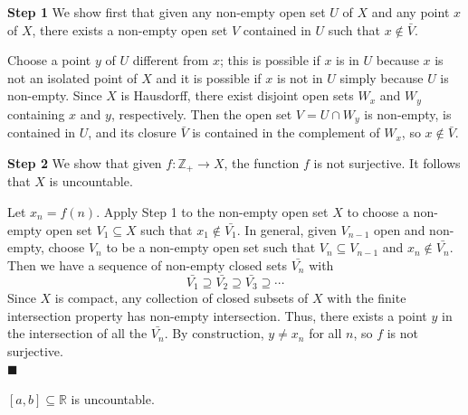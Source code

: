 \documentclass[main.tex]{subfiles}
\begin{document}
\par \noindent \textbf{Step 1} We show first that given any non-empty open set $U$ of $X$ and any point $x$ of $X$, there exists a non-empty open set $V$ contained in $U$ such that $x \notin \bar{V}$. 
\par Choose a point $y$ of $U$ different from $x$; this is possible if $x$ is in $U$ because $x$ is not an isolated point of $X$ and it is possible if $x$ is not in $U$ simply because $U$ is non-empty. Since $X$ is Hausdorff, there exist disjoint open sets $W_x$ and $W_y$ containing $x$ and $y$, respectively. Then the open set $V = U \cap W_y$ is non-empty, is contained in $U$, and its closure $\bar{V}$ is contained in the complement of $W_x$, so $x \notin \bar{V}$. 
\par \noindent \textbf{Step 2} We show that given $f: \mathbb{Z}_{+} \to X$, the function $f$ is not surjective. It follows that $X$ is uncountable. 
\par Let $x_n = f(n)$. Apply Step 1 to the non-empty open set $X$ to choose a non-empty open set $V_1 \subseteq X$ such that $x_1 \notin \bar{V_1}$. In general, given $V_{n - 1}$ open and non-empty, choose $V_n$ to be a non-empty open set such that $V_n \subseteq V_{n - 1}$ and $x_n \notin \bar{V_n}$. Then we have a sequence of non-empty closed sets $\bar{V_n}$ with
\begin{equation}
    \bar{V_1} \supseteq \bar{V_2} \supseteq \bar{V_3} \supseteq \cdots
\end{equation}
Since $X$ is compact, any collection of closed subsets of $X$ with the finite intersection property has non-empty intersection. Thus, there exists a point $y$ in the intersection of all the $\bar{V_n}$. By construction, $y \neq x_n$ for all $n$, so $f$ is not surjective. 
\mbox{} \\ \null \hfill $\blacksquare$ 


\begin{corollary}
    $[a, b] \subseteq \mathbb{R}$ is uncountable. 
\end{corollary}
\end{document}
